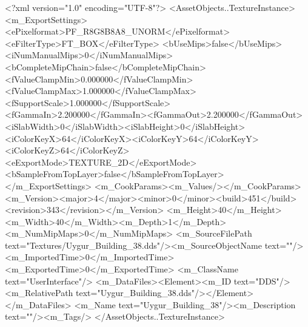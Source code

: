 <?xml version="1.0" encoding="UTF-8"?>
<AssetObjects..TextureInstance>
  <m_ExportSettings>
    <ePixelformat>PF_R8G8B8A8_UNORM</ePixelformat><eFilterType>FT_BOX</eFilterType>
    <bUseMips>false</bUseMips><iNumManualMips>0</iNumManualMips><bCompleteMipChain>false</bCompleteMipChain>
    <fValueClampMin>0.000000</fValueClampMin><fValueClampMax>1.000000</fValueClampMax><fSupportScale>1.000000</fSupportScale>
    <fGammaIn>2.200000</fGammaIn><fGammaOut>2.200000</fGammaOut><iSlabWidth>0</iSlabWidth><iSlabHeight>0</iSlabHeight>
    <iColorKeyX>64</iColorKeyX><iColorKeyY>64</iColorKeyY><iColorKeyZ>64</iColorKeyZ>
    <eExportMode>TEXTURE_2D</eExportMode><bSampleFromTopLayer>false</bSampleFromTopLayer>
  </m_ExportSettings>
  <m_CookParams><m_Values/></m_CookParams>
  <m_Version><major>4</major><minor>0</minor><build>451</build><revision>343</revision></m_Version>
  <m_Height>40</m_Height><m_Width>40</m_Width><m_Depth>1</m_Depth><m_NumMipMaps>0</m_NumMipMaps>
  <m_SourceFilePath text="Textures/Uygur_Building_38.dds"/><m_SourceObjectName text=""/>
  <m_ImportedTime>0</m_ImportedTime><m_ExportedTime>0</m_ExportedTime>
  <m_ClassName text="UserInterface"/>
  <m_DataFiles><Element><m_ID text="DDS"/><m_RelativePath text="Uygur_Building_38.dds"/></Element></m_DataFiles>
  <m_Name text="Uygur_Building_38"/><m_Description text=""/><m_Tags/>
</AssetObjects..TextureInstance>

